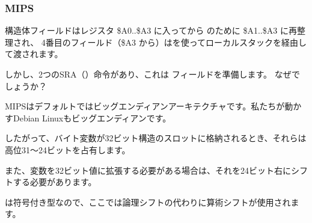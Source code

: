 ﻿\subsubsection{MIPS}
\label{MIPS_structure_big_endian}



構造体フィールドはレジスタ \$A0..\$A3 に入ってから \printf のために \$A1..\$A3 に再整理され、
4番目のフィールド（\$A3 から）はを使ってローカルスタックを経由して渡されます。

しかし、2つのSRA（）命令があり、これは \Tchar フィールドを準備します。 
なぜでしょうか？

MIPSはデフォルトではビッグエンディアンアーキテクチャです。私たちが動かすDebian Linuxもビッグエンディアンです。

したがって、バイト変数が32ビット構造のスロットに格納されるとき、それらは高位31～24ビットを占有します。

また、\Tchar 変数を32ビット値に拡張する必要がある場合は、それを24ビット右にシフトする必要があります。

\Tchar は符号付き型なので、ここでは論理シフトの代わりに算術シフトが使用されます。

